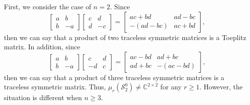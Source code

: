 \documentclass[reqno]{amsart}
\theoremstyle{definition}
\numberwithin{equation}{section}
\begin{document}
First, we consider the case of $n=2$. Since
\begin{equation*}
    \begin{bmatrix}
        a & b\\
        b & -a
    \end{bmatrix}\begin{bmatrix}
        c & d\\
        d & -c
    \end{bmatrix}=\begin{bmatrix}
        ac+bd & ad-bc\\
        -(ad-bc) & ac+bd
    \end{bmatrix},
\end{equation*}
then we can say that a product of two traceless symmetric matrices is a Toeplitz matrix. In addition, since
\begin{equation*}
    \begin{bmatrix}
        a & b\\
        b & -a
    \end{bmatrix}\begin{bmatrix}
        c & d\\
        -d & c
    \end{bmatrix}=\begin{bmatrix}
        ac-bd & ad+bc\\
        ad+bc & -(ac-bd)
    \end{bmatrix},
\end{equation*}
then we can say that a product of three traceless symmetric matrices is a traceless symmetric matrix. Thus, $\mu_r(\mathcal{S}_2^0) \neq \mathbb{C}^{2 \times 2}$ for any $r \geq 1$. However, the situation is different when $n \geq 3$.
\end{document}
